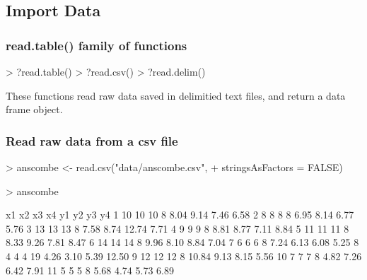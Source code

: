 \documentclass{beamer}
\begin{document}
\subsection{Import Data}
\begin{frame}[fragile]
\frametitle{read.table() family of functions}

\begin{Schunk}
\begin{Sinput}
> ?read.table()
> ?read.csv()
> ?read.delim()
\end{Sinput}
\end{Schunk}

These functions read raw data saved in delimitied text files, and return a data frame object.

\end{frame}


\begin{frame}[fragile]
\frametitle{Read raw data from a csv file}

\begin{Schunk}
\begin{Sinput}
> anscombe <- read.csv("data/anscombe.csv", 
+                      stringsAsFactors = FALSE)
\end{Sinput}
\end{Schunk}
\pause
\begin{Schunk}
\begin{Sinput}
> anscombe
\end{Sinput}
\begin{Soutput}
   x1 x2 x3 x4    y1   y2    y3    y4
1  10 10 10  8  8.04 9.14  7.46  6.58
2   8  8  8  8  6.95 8.14  6.77  5.76
3  13 13 13  8  7.58 8.74 12.74  7.71
4   9  9  9  8  8.81 8.77  7.11  8.84
5  11 11 11  8  8.33 9.26  7.81  8.47
6  14 14 14  8  9.96 8.10  8.84  7.04
7   6  6  6  8  7.24 6.13  6.08  5.25
8   4  4  4 19  4.26 3.10  5.39 12.50
9  12 12 12  8 10.84 9.13  8.15  5.56
10  7  7  7  8  4.82 7.26  6.42  7.91
11  5  5  5  8  5.68 4.74  5.73  6.89
\end{Soutput}
\end{Schunk}

\end{frame}



\end{document}
